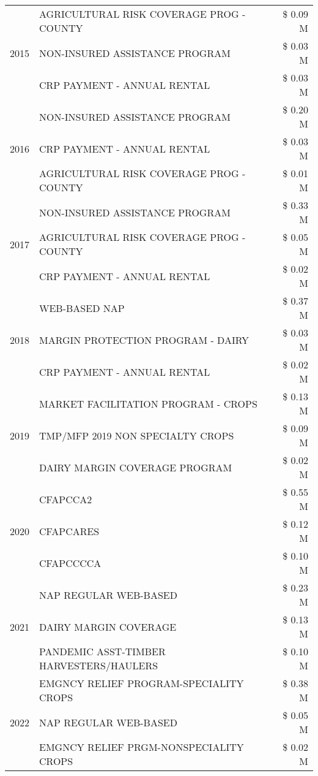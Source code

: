 \begin{tabular}{llr}
\cline{1-3}
\multirow[t]{3}{*}{2015} & AGRICULTURAL RISK COVERAGE PROG - COUNTY & \$ 0.09 M \\
 & NON-INSURED ASSISTANCE PROGRAM & \$ 0.03 M \\
 & CRP PAYMENT - ANNUAL RENTAL & \$ 0.03 M \\
\cline{1-3}
\multirow[t]{3}{*}{2016} & NON-INSURED ASSISTANCE PROGRAM & \$ 0.20 M \\
 & CRP PAYMENT - ANNUAL RENTAL & \$ 0.03 M \\
 & AGRICULTURAL RISK COVERAGE PROG - COUNTY & \$ 0.01 M \\
\cline{1-3}
\multirow[t]{3}{*}{2017} & NON-INSURED ASSISTANCE PROGRAM & \$ 0.33 M \\
 & AGRICULTURAL RISK COVERAGE PROG - COUNTY & \$ 0.05 M \\
 & CRP PAYMENT - ANNUAL RENTAL & \$ 0.02 M \\
\cline{1-3}
\multirow[t]{3}{*}{2018} & WEB-BASED NAP & \$ 0.37 M \\
 & MARGIN PROTECTION PROGRAM - DAIRY & \$ 0.03 M \\
 & CRP PAYMENT - ANNUAL RENTAL & \$ 0.02 M \\
\cline{1-3}
\multirow[t]{3}{*}{2019} & MARKET FACILITATION PROGRAM - CROPS & \$ 0.13 M \\
 & TMP/MFP 2019 NON SPECIALTY CROPS & \$ 0.09 M \\
 & DAIRY MARGIN COVERAGE PROGRAM & \$ 0.02 M \\
\cline{1-3}
\multirow[t]{3}{*}{2020} & CFAPCCA2 & \$ 0.55 M \\
 & CFAPCARES & \$ 0.12 M \\
 & CFAPCCCCA & \$ 0.10 M \\
\cline{1-3}
\multirow[t]{3}{*}{2021} & NAP REGULAR WEB-BASED & \$ 0.23 M \\
 & DAIRY MARGIN COVERAGE & \$ 0.13 M \\
 & PANDEMIC ASST-TIMBER HARVESTERS/HAULERS & \$ 0.10 M \\
\cline{1-3}
\multirow[t]{3}{*}{2022} & EMGNCY RELIEF PROGRAM-SPECIALITY CROPS & \$ 0.38 M \\
 & NAP REGULAR WEB-BASED & \$ 0.05 M \\
 & EMGNCY RELIEF PRGM-NONSPECIALITY CROPS & \$ 0.02 M \\
\cline{1-3}
\bottomrule
\end{tabular}
